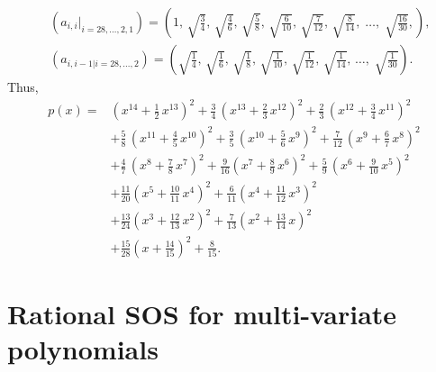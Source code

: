 \documentclass[runningheads]{llncs}
\begin{document}
{\begin{align*}
&\,\left(a_{i,i}|_{i=28,\ldots,2,1}\right)
=\left(1,\,\sqrt{\frac{3}{4}},\,\sqrt{\frac{4}{6}},\,\sqrt{\frac{5}{8}},\,\sqrt{\frac{6}{10}},\,\sqrt{\frac{7}{12}},\,
\sqrt{\frac{8}{14}},\;\ldots,\; \sqrt{\frac{16}{30}},
\right),\\
&\,\left(a_{i,i-1|i=28,\ldots,2}\right)
=\left(\sqrt{\frac{1}{4}},\,\sqrt{\frac{1}{6}},\,\sqrt{\frac{1}{8}},\,\sqrt{\frac{1}{10}},\,
\sqrt{\frac{1}{12}},\,\sqrt{\frac{1}{14}},\,
\ldots,\; \sqrt{\frac{1}{30}}\right).
\end{align*}
Thus, 
\begin{align}
p(x)=&
\left( {x}^{14}+\frac{1}{2}\,{x}^{13} \right) ^{2}
+\frac{3}{4}\, \left( {x}^{13}+\frac{2}{3}\,{x}^{12} \right) ^{2}
+\frac{2}{3}\, \left( {x}^{12}+\frac{3}{4}\,{x}^{11} \right) ^{2}
\nonumber\\
&
+\frac{5}{8}\, \left( {x}^{11}+\frac{4}{5}\,{x}^{10} \right) ^{2} +\frac{3}{5}\, \left( {x}^{10}+\frac{5}{6}\,{x}^{9} \right) ^{2}
 +{\frac {7}{12}\, \left( {x}^{9}+\frac{6}{7}\,{x}^{8} \right) ^{2}}
\nonumber\\
&
+\frac{4}{7}\, \left( {x}^{8}+{\frac {7}{8}\,{x}^{7}} \right) ^{2}
+{\frac {9}{16} \left( {x}^{7}+{\frac {8}{9}\,{x}^{6}} \right) ^{2}}+\frac{5}{9}\, \left( {x}^{6}+{\frac {9}{10}\,{x}^{5}} \right) ^{2}\nonumber
\\
&
+{\frac {11}{20} \left( {x}^{5}+{\frac {10}{11}\,{x}^{4}} \right) ^{2}}
+{\frac {6}{11} \left( {x}^{4}+{\frac {11}{12}\,{x}^{3}} \right) ^{2}}
\nonumber\\
&
+{\frac {13}{24} \left( {x}^{3}+{\frac {12}{13}\,{x}^{2}} \right) ^{2}}
+{\frac {7}{13} \left( {x}^{2}+{\frac {13}{14}\,x} \right) ^{2}}
\nonumber\\
&
+{\frac {15}{28} \left( x+{\frac{14}{15}} \right) ^{2}}
+{\frac{8}{15}}.
\label{poly28}
\end{align}

\section{Rational SOS for multi-variate polynomials}

}
\end{document}
